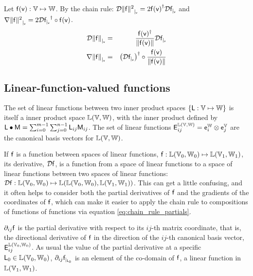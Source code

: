 Let $\mathsf{f}(\mathsf{v}) : \mathbb{V} \mapsto \mathbb{W}$.
By the chain rule:
${\mathcal{D}{\| \mathsf{f} \|^2}_{\mid_{\mathsf{v}}}}  =  2 {\mathsf{f}(\mathsf{v})}^{\dagger} {\mathcal{D}{\mathsf{f}}_{\mid_{\mathsf{v}}}} $
and
${\mathbf \nabla}{\| \mathsf{f} \|^2}_{\mid_{\mathsf{v}}}  =  2 {\mathcal{D}{\mathsf{f}}_{\mid_{\mathsf{v}}}}^\dagger \circ \mathsf{f}(\mathsf{v})$.
\begin{eqnarray}
\label{eq:norm_derivative}
{\mathcal{D}{\| \mathsf{f}\|}_{\mid_{\mathsf{v}}}}
& = &
\frac{\mathsf{f}(\mathsf{v})^\dagger}{\| \mathsf{f}(\mathsf{v}) \|} {\mathcal{D}{\mathsf{f}}_{\mid_{\mathsf{v}}}}  \\
{\mathbf \nabla}{\| \mathsf{f} \|}_{\mid_{\mathsf{v}}}
& = &
\left({\mathcal{D}{\mathsf{f}}_{\mid_{\mathsf{v}}}}\right)^\dagger \circ  \frac{\mathsf{f}(\mathsf{v})}{ \| \mathsf{f}(\mathsf{v})  \|}
\label{eq:norm_gradient}
\end{eqnarray}


\subsection{Linear-function-valued functions}
\label{sec:Linear-function-valued-functions}

The set of linear functions between two inner product spaces
$\{ \mathsf{L} : \mathbb{V} \mapsto \mathbb{W} \}$
is itself a inner product space $\mathbb{L}(\mathbb{V},\mathbb{W})$,
with the inner product defined by
$\mathsf{L} \bullet \mathsf{M} = \sum_{i=0}^{m-1} \sum_{j=0}^{n-1} \mathsf{L}_{ij} \mathsf{M}_{ij}$.
The set of linear functions
$\mathsf{E}_{ij}^{\mathbb{L}(\mathbb{V},\mathbb{W})}  = \mathsf{e}_i^{\mathbb{W}} \otimes \mathsf{e}_j^{\mathbb{V}}$
are the canonical basis vectors for $\mathbb{L}(\mathbb{V},\mathbb{W})$.

If $\mathsf{f}$ is a function between spaces of linear functions,
$\mathsf{f} : \mathbb{L}(\mathbb{V}_0,\mathbb{W}_0) \mapsto \mathbb{L}(\mathbb{V}_1,\mathbb{W}_1)$,
its derivative, ${\mathcal{D}{\mathsf{f}}}$,
is a function from a space of linear functions
to a space of linear functions between two
spaces of linear functions:
${\mathcal{D}{\mathsf{f}}} : \mathbb{L}(\mathbb{V}_0,\mathbb{W}_0) \mapsto
\mathbb{L}(\mathbb{L}(\mathbb{V}_0,\mathbb{W}_0), \mathbb{L}(\mathbb{V}_1,\mathbb{W}_1))$.
This can get a little confusing,
and it often helps to consider both the partial derivatives of $\mathsf{f}$
and the gradients of the coordinates of $\mathsf{f}$,
which can make it easier to apply the chain rule to
compositions of functions of functions via equation \ref{eq:chain_rule_partials}.

${\partial}_{ij}{\mathsf{f}}$ is the partial derivative with respect to its $ij$-th matrix coordinate,
that is, the directional derivative of $\mathsf{f}$ in the direction
of the $ij$-th canonical basis vector, $\mathsf{E}_{ij}^{\mathbb{L}(\mathbb{V}_0,\mathbb{W}_0)}$.
As usual the value of the partial derivative at a specific
$\mathsf{L}_0 \in  \mathbb{L}(\mathbb{V}_0,\mathbb{W}_0)$,
${\partial}_{ij}{\mathsf{f}}_{\mid_{\mathsf{L}_0}}$ is an element of the co-domain of $\mathsf{f}$,
a linear function in  $\mathbb{L}(\mathbb{V}_1,\mathbb{W}_1)$.

